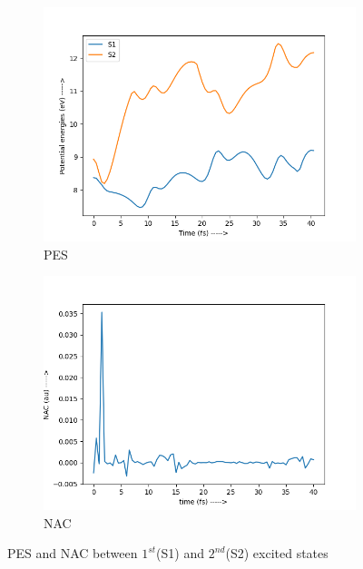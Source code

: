 \documentclass[12pt]{article}
\begin{document}
\begin{figure}[h]
\begin{subfigure}{.5\textwidth}
  \centering
  \includegraphics[width=1.0\linewidth]{PES_23.png}
  \caption{PES}
  \label{fig:sfig1}
\end{subfigure}%
\begin{subfigure}{.5\textwidth}
  \centering
  \includegraphics[width=1.0\linewidth]{nac_23.png}
  \caption{NAC}
  \label{fig:sfig2}
\end{subfigure}
\caption{PES and NAC between $1^{st}$(S1) and $2^{nd}$(S2) excited states}
\label{fig:NAC_23}
\end{figure}
\end{document}
